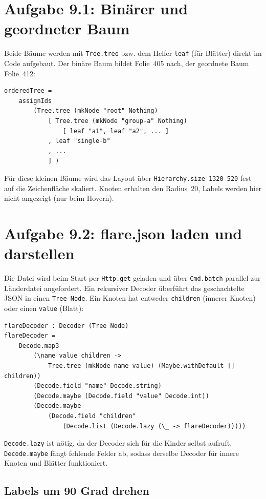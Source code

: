 \documentclass[11pt,a4paper]{article}
\begin{document}
\section*{Aufgabe 9.1: Binärer und geordneter Baum}

Beide Bäume werden mit \texttt{Tree.tree} bzw. dem Helfer \texttt{leaf}
(für Blätter) direkt im Code aufgebaut. Der binäre Baum bildet Folie~405 nach,
der geordnete Baum Folie~412:

\begin{verbatim}
orderedTree =
    assignIds
        (Tree.tree (mkNode "root" Nothing)
            [ Tree.tree (mkNode "group-a" Nothing)
                [ leaf "a1", leaf "a2", ... ]
            , leaf "single-b"
            , ...
            ] )
\end{verbatim}

Für diese kleinen Bäume wird das Layout über
\texttt{Hierarchy.size 1320 520} fest auf die Zeichenfläche skaliert. Knoten
erhalten den Radius~20, Labels werden hier nicht angezeigt (nur beim Hovern).

\section*{Aufgabe 9.2: flare.json laden und darstellen}

Die Datei wird beim Start per \texttt{Http.get} geladen und über
\texttt{Cmd.batch} parallel zur Länderdatei angefordert. Ein rekursiver
Decoder überführt das geschachtelte JSON in einen \texttt{Tree Node}. Ein
Knoten hat entweder \texttt{children} (innerer Knoten) oder einen
\texttt{value} (Blatt):

\begin{verbatim}
flareDecoder : Decoder (Tree Node)
flareDecoder =
    Decode.map3
        (\name value children ->
            Tree.tree (mkNode name value) (Maybe.withDefault [] children))
        (Decode.field "name" Decode.string)
        (Decode.maybe (Decode.field "value" Decode.int))
        (Decode.maybe
            (Decode.field "children"
                (Decode.list (Decode.lazy (\_ -> flareDecoder)))))
\end{verbatim}

\texttt{Decode.lazy} ist nötig, da der Decoder sich für die Kinder selbst
aufruft. \texttt{Decode.maybe} fängt fehlende Felder ab, sodass derselbe
Decoder für innere Knoten und Blätter funktioniert.

\subsection*{Labels um 90 Grad drehen}
\end{document}

